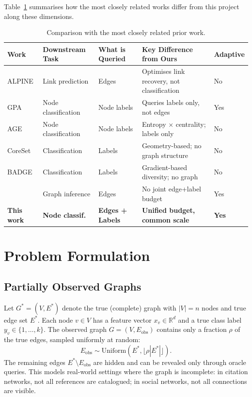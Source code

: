 \documentclass[12pt,a4paper,oneside]{report}
\begin{document}
Table~\ref{tab:related} summarises how the most closely related works differ from this project along these dimensions.

\begin{table}[htbp]
\centering
\caption{Comparison with the most closely related prior work.}
\label{tab:related}
\small
\begin{tabularx}{\textwidth}{>{\raggedright\arraybackslash}p{2.8cm}>{\raggedright\arraybackslash}X>{\raggedright\arraybackslash}X>{\raggedright\arraybackslash}X>{\raggedright\arraybackslash}p{1.8cm}}
\toprule
Work & Downstream Task & What is Queried & Key Difference from Ours & Adaptive \\
\midrule
ALPINE \citep{alpine} & Link prediction & Edges & Optimises link recovery, not classification & No \\
GPA \citep{gpa} & Node classification & Node labels & Queries labels only, not edges & Yes \\
AGE \citep{age} & Node classification & Node labels & Entropy $\times$ centrality; labels only & No \\
CoreSet \citep{sener} & Classification & Labels & Geometry-based; no graph structure & No \\
BADGE \citep{ash} & Classification & Labels & Gradient-based diversity; no graph & No \\
\citet{scout} & Graph inference & Edges & No joint edge+label budget & Yes \\
\textbf{This work} & \textbf{Node classif.} & \textbf{Edges + Labels} & \textbf{Unified budget, common scale} & \textbf{Yes} \\
\bottomrule
\end{tabularx}
\end{table}


\chapter{Problem Formulation}
\label{ch:formulation}

\section{Partially Observed Graphs}

Let $G^* = (V, E^*)$ denote the true (complete) graph with $|V| = n$ nodes and true edge set $E^*$. Each node $v \in V$ has a feature vector $x_v \in \mathbb{R}^d$ and a true class label $y_v \in \{1, \ldots, k\}$. The observed graph $G = (V, E_{\text{obs}})$ contains only a fraction $\rho$ of the true edges, sampled uniformly at random:
\begin{equation}
    E_{\text{obs}} \sim \text{Uniform}(E^*, \lfloor \rho |E^*| \rfloor).
\end{equation}
The remaining edges $E^* \setminus E_{\text{obs}}$ are hidden and can be revealed only through oracle queries. This models real-world settings where the graph is incomplete: in citation networks, not all references are catalogued; in social networks, not all connections are visible.
\end{document}
